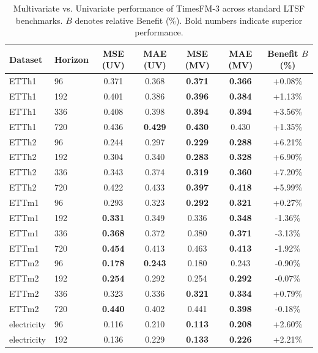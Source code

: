 \begin{table}[t]
\centering
\caption{Multivariate vs. Univariate performance of TimesFM-3 across standard LTSF benchmarks. $B$ denotes relative Benefit (\%). Bold numbers indicate superior performance.}
\label{tab:ltsf_main}
\small
\begin{tabular}{ll|cc|cc|c}
\toprule
\textbf{Dataset} & \textbf{Horizon} & \textbf{MSE (UV)} & \textbf{MAE (UV)} & \textbf{MSE (MV)} & \textbf{MAE (MV)} & \textbf{Benefit $B$ (\%)} \\
\midrule
ETTh1 & 96 & 0.371  & 0.368  &  \textbf{0.371} &  \textbf{0.366} & +0.08\% \\
ETTh1 & 192 & 0.401  & 0.386  &  \textbf{0.396} &  \textbf{0.384} & +1.13\% \\
ETTh1 & 336 & 0.408  & 0.398  &  \textbf{0.394} &  \textbf{0.394} & +3.56\% \\
ETTh1 & 720 & 0.436  & \textbf{0.429}  &  \textbf{0.430} &  0.430 & +1.35\% \\
ETTh2 & 96 & 0.244  & 0.297  &  \textbf{0.229} &  \textbf{0.288} & +6.21\% \\
ETTh2 & 192 & 0.304  & 0.340  &  \textbf{0.283} &  \textbf{0.328} & +6.90\% \\
ETTh2 & 336 & 0.343  & 0.374  &  \textbf{0.319} &  \textbf{0.360} & +7.20\% \\
ETTh2 & 720 & 0.422  & 0.433  &  \textbf{0.397} &  \textbf{0.418} & +5.99\% \\
ETTm1 & 96 & 0.293  & 0.323  &  \textbf{0.292} &  \textbf{0.321} & +0.27\% \\
ETTm1 & 192 & \textbf{0.331}  & 0.349  &  0.336 &  \textbf{0.348} & -1.36\% \\
ETTm1 & 336 & \textbf{0.368}  & 0.372  &  0.380 &  \textbf{0.371} & -3.13\% \\
ETTm1 & 720 & \textbf{0.454}  & 0.413  &  0.463 &  \textbf{0.413} & -1.92\% \\
ETTm2 & 96 & \textbf{0.178}  & \textbf{0.243}  &  0.180 &  0.243 & -0.90\% \\
ETTm2 & 192 & \textbf{0.254}  & 0.292  &  0.254 &  \textbf{0.292} & -0.07\% \\
ETTm2 & 336 & 0.323  & 0.336  &  \textbf{0.321} &  \textbf{0.334} & +0.79\% \\
ETTm2 & 720 & \textbf{0.440}  & 0.402  &  0.441 &  \textbf{0.398} & -0.18\% \\
electricity & 96 & 0.116  & 0.210  &  \textbf{0.113} &  \textbf{0.208} & +2.60\% \\
electricity & 192 & 0.136  & 0.229  &  \textbf{0.133} &  \textbf{0.226} & +2.21\% \\

\end{tabular}
\end{table}
